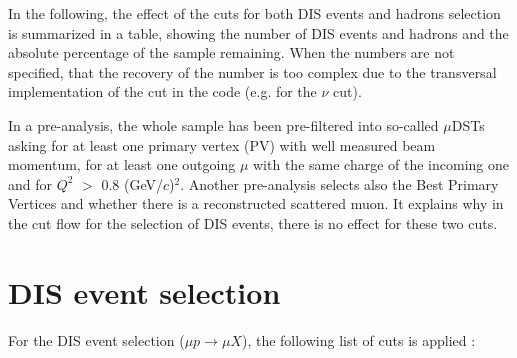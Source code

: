 In the following, the effect of the cuts for both DIS events and hadrons selection is summarized in a table, showing the number of DIS events and hadrons and the absolute percentage of the sample remaining. When the numbers are not specified, that the recovery of the number is too complex due to the transversal implementation of the cut in the code (e.g. for the $\nu$ cut).

In a pre-analysis, the whole sample has been pre-filtered into so-called $\mu$DSTs asking for at least one primary vertex (PV) with well measured beam momentum, for at least one outgoing $\mu$ with the same charge of the incoming one and for $Q^2$ $>$ 0.8 (GeV/$c$)$^2$. Another pre-analysis selects also the Best Primary Vertices and whether there is a reconstructed scattered muon. It explains why in the cut flow for the selection of DIS events, there is no effect for these two cuts.


\section{DIS event selection}

For the DIS event selection ($\mu p \rightarrow \mu X$), the following list of cuts is applied :

\newpage

